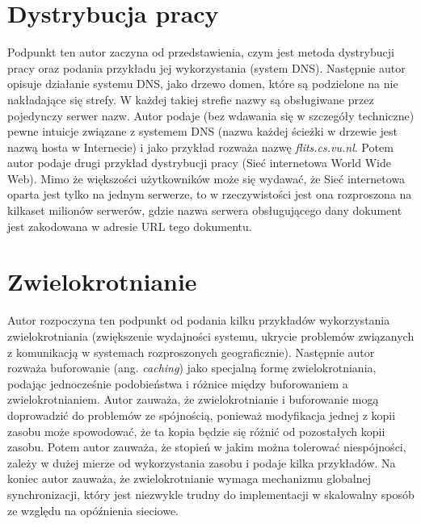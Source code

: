 \documentclass[10pt, a4paper]{article}
\begin{document}
\section*{Dystrybucja pracy}
Podpunkt ten autor zaczyna od przedstawienia, czym jest metoda dystrybucji pracy oraz podania przykładu jej wykorzystania (system DNS). Następnie autor opisuje działanie systemu DNS, jako drzewo domen, które są podzielone na nie nakładające się strefy. W każdej takiej strefie nazwy są obsługiwane przez pojedynczy
serwer nazw. Autor podaje (bez wdawania się w szczegóły techniczne) pewne intuicje związane z systemem DNS (nazwa każdej ścieżki w drzewie jest nazwą hosta w Internecie) i jako przykład rozważa nazwę \textit{flits.cs.vu.nl}. Potem autor podaje drugi przykład dystrybucji pracy (Sieć internetowa World Wide Web). Mimo że większości użytkowników może się wydawać, że Sieć internetowa oparta jest tylko na jednym serwerze, to w rzeczywistości jest ona rozproszona na kilkaset milionów serwerów, gdzie nazwa serwera obsługującego dany dokument jest zakodowana w adresie URL tego dokumentu.
\section*{Zwielokrotnianie}
Autor rozpoczyna ten podpunkt od podania kilku przykładów wykorzystania zwielokrotniania (zwiększenie wydajności systemu, ukrycie problemów związanych z komunikacją w systemach rozproszonych geograficznie). Następnie autor rozważa buforowanie (ang. \textit{caching}) jako specjalną formę zwielokrotniania, podając jednocześnie podobieństwa i różnice między buforowaniem a zwielokrotnianiem. Autor zauważa, że zwielokrotnianie i buforowanie mogą doprowadzić do problemów ze spójnością, ponieważ modyfikacja jednej z kopii zasobu może spowodować, że ta kopia będzie się różnić od pozostałych kopii zasobu. Potem autor zauważa, że stopień w jakim można tolerować niespójności, zależy w dużej mierze od wykorzystania zasobu i podaje kilka przykładów. Na koniec autor zauważa, że zwielokrotnianie wymaga mechanizmu globalnej synchronizacji, który jest niezwykle trudny do implementacji w skalowalny sposób ze względu na opóźnienia sieciowe.
\end{document}
